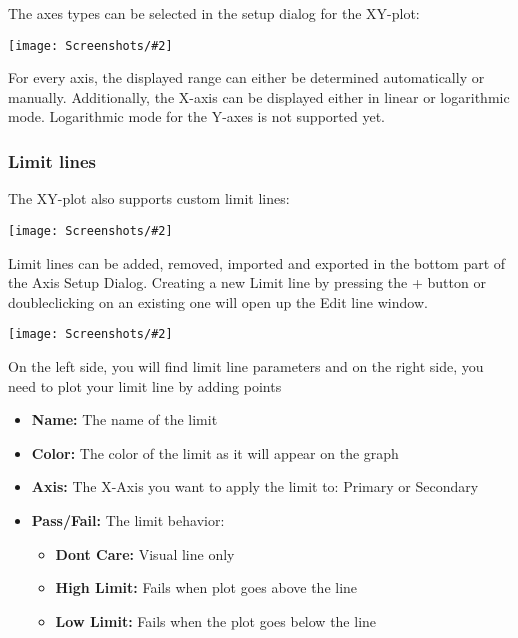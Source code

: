 \documentclass[a4paper,11pt]{article}
\newcommand{\screenshot}[2]{\begin{center}
\texttt{[image: Screenshots/\#2]}
\end{center}}
\begin{document}
The axes types can be selected in the setup dialog for the XY-plot:
\screenshot{1.0}{GraphXYplotSetup.png}
For every axis, the displayed range can either be determined automatically or manually. Additionally, the X-axis can be displayed either in linear or logarithmic mode. Logarithmic mode for the Y-axes is not supported yet.

\subsubsection{Limit lines}
The XY-plot also supports custom limit lines:
\screenshot{1.0}{GraphXYplotLimit.png}
Limit lines can be added, removed, imported and exported in the bottom part of the Axis Setup Dialog. Creating a new Limit line by pressing the + button or doubleclicking on an existing one will open up the Edit line window.
\screenshot{1.0}{GraphXYplotLine.png}
On the left side, you will find limit line parameters and on the right side, you need to plot your limit line by adding points
\begin{itemize}
\item \textbf{Name:} The name of the limit
\item \textbf{Color:} The color of the limit as it will appear on the graph
\item \textbf{Axis:} The X-Axis you want to apply the limit to: Primary or Secondary
\item \textbf{Pass/Fail:} The limit behavior:
\begin{itemize}
\item \textbf{Dont Care:} Visual line only
\item \textbf{High Limit:} Fails when plot goes above the line
\item \textbf{Low Limit:} Fails when the plot goes below the line
\end{itemize}
\end{itemize}
\end{document}
